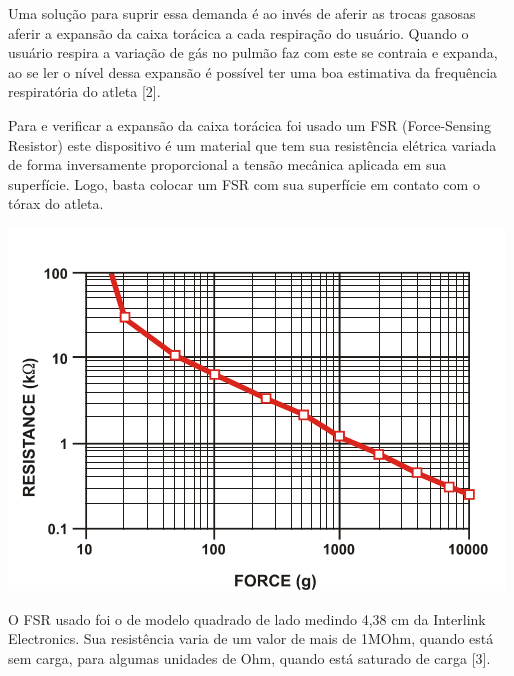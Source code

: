 	Uma solução para suprir essa demanda é ao invés de aferir as trocas gasosas aferir a expansão da caixa torácica a cada respiração do usuário. Quando o usuário respira a variação de gás no pulmão faz com este se contraia e expanda, ao se ler o nível dessa expansão é possível ter uma boa estimativa da frequência respiratória do atleta [2].
    
	Para e verificar a expansão da caixa torácica foi usado um FSR (Force-Sensing Resistor) este dispositivo é um material que tem sua resistência elétrica variada de forma inversamente proporcional a tensão mecânica aplicada em sua superfície. Logo, basta colocar um FSR com sua superfície em contato com o tórax do atleta.
    
    \begin{center}
    	\includegraphics[scale=0.5]{figuras/fsr_resistance_force.png}
        \label{fsr_curve}
    \end{center}

	O FSR usado foi o de modelo quadrado de lado medindo 4,38 cm da Interlink Electronics. Sua resistência varia de um valor de mais de 1MOhm, quando está sem carga, para algumas unidades de Ohm, quando está saturado de carga [3].
    

